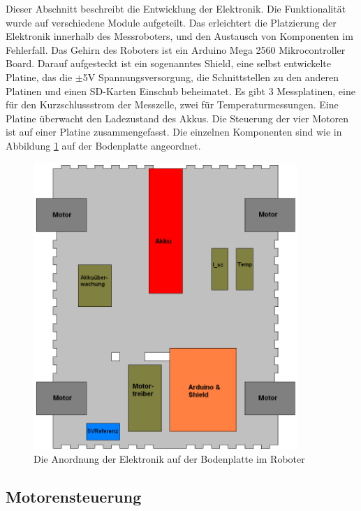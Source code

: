 \documentclass[a4paper,bibtotoc,oneside]{scrbook}
\begin{document}
Dieser Abschnitt beschreibt die Entwicklung der Elektronik. Die Funktionalität wurde auf verschiedene Module aufgeteilt. Das erleichtert die Platzierung der Elektronik innerhalb des Messroboters, und den Austausch von Komponenten im Fehlerfall. 
Das Gehirn des Roboters ist ein Arduino Mega 2560 Mikrocontroller Board. Darauf aufgesteckt ist ein sogenanntes Shield, eine selbst entwickelte Platine, das die $\pm$5V Spannungsversorgung, die Schnittstellen zu den anderen Platinen und einen SD-Karten Einschub beheimatet.
Es gibt 3 Messplatinen, eine für den Kurzschlussstrom der Messzelle, zwei für Temperaturmessungen. Eine Platine überwacht den Ladezustand des Akkus. Die Steuerung der vier Motoren ist auf einer Platine zusammengefasst.
Die einzelnen Komponenten sind wie in Abbildung \ref{elek} auf der Bodenplatte angeordnet.
\begin{figure}[htbp]
\centering
\includegraphics[width=100mm]{img/bodenplatte.png}
\caption{Die Anordnung der Elektronik auf der Bodenplatte im Roboter}\label{elek}
\end{figure}
 
\subsection{Motorensteuerung}\thispagestyle{empty}
\end{document}
